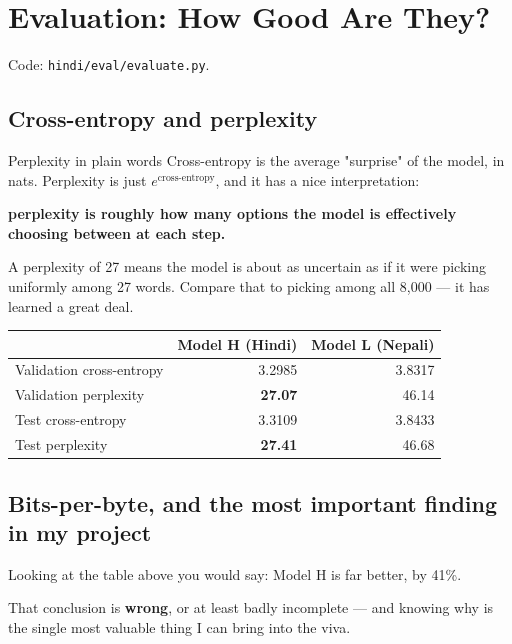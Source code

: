 \documentclass[11pt]{report}
\newcommand{\p}[1]{\texttt{#1}}
\begin{document}
\chapter{Evaluation: How Good Are They?}

Code: \p{hindi/eval/evaluate.py}.

\section{Cross-entropy and perplexity}

\begin{concept}{Perplexity in plain words}
Cross-entropy is the average "surprise" of the model, in nats. Perplexity is just
$e^{\text{cross-entropy}}$, and it has a nice interpretation:

\textbf{perplexity is roughly how many options the model is effectively choosing
between at each step.}

A perplexity of 27 means the model is about as uncertain as if it were picking
uniformly among 27 words. Compare that to picking among all 8,000 --- it has
learned a great deal.
\end{concept}

\begin{center}
\begin{tabular}{lrr}
\toprule
& \textbf{Model H (Hindi)} & \textbf{Model L (Nepali)} \\
\midrule
Validation cross-entropy & 3.2985 & 3.8317 \\
Validation perplexity & \textbf{27.07} & 46.14 \\
Test cross-entropy & 3.3109 & 3.8433 \\
Test perplexity & \textbf{27.41} & 46.68 \\
\bottomrule
\end{tabular}
\end{center}

\section{Bits-per-byte, and the most important finding in my project}

\begin{warnbox}
Looking at the table above you would say: Model H is far better, by 41\%.

That conclusion is \textbf{wrong}, or at least badly incomplete --- and knowing
why is the single most valuable thing I can bring into the viva.
\end{warnbox}
\end{document}
